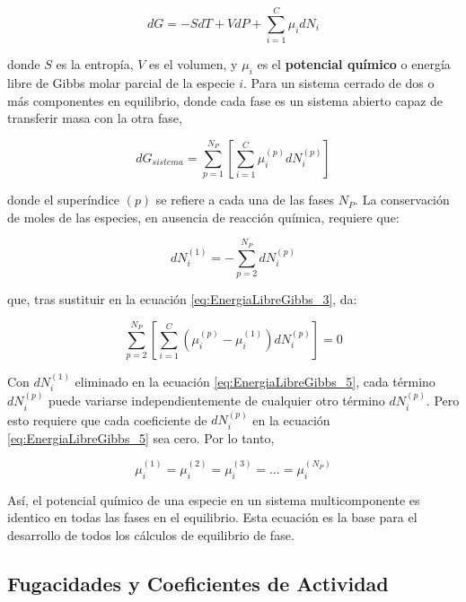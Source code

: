 \documentclass[11pt]{book}
\begin{document}
\begin{equation}
    \label{eq:EnergiaLibreGibbs_2}
    dG = -S dT + V dP + \sum_{i = 1}^{C} \mu_i dN_i
\end{equation}

donde $S$ es la entropía, $V$ es el volumen, y $\mu_i$ es el \textbf{potencial químico} o energía libre de Gibbs molar parcial de la especie $i$. Para un sistema cerrado de dos o más componentes en equilibrio, donde cada fase es un sistema abierto capaz de transferir masa con la otra fase,

\begin{equation}
    \label{eq:EnergiaLibreGibbs_3}
    dG_{sistema} = \sum_{p = 1}^{N_P} \left[ \sum_{i = 1}^{C} \mu_i^{(p)} dN_i^{(p)} \right]
\end{equation}

donde el superíndice $(p)$ se refiere a cada una de las fases $N_P$. La conservación de moles de las especies, en ausencia de reacción química, requiere que:

\begin{equation}
    \label{eq:EnergiaLibreGibbs_4}
    dN_i^{(1)} = - \sum_{p = 2}^{N_P} dN_i^{(p)}
\end{equation}

que, tras sustituir en la ecuación \ref{eq:EnergiaLibreGibbs_3}, da:

\begin{equation}
    \label{eq:EnergiaLibreGibbs_5}
    \sum_{p = 2}^{N_P} \left[ \sum_{i = 1}^{C} \left( \mu_i^{(p)} -\mu_i^{(1)} \right) dN_i^{(p)} \right] = 0
\end{equation}

Con $dN_i^{(1)}$ eliminado en la ecuación \ref{eq:EnergiaLibreGibbs_5}, cada término $dN_i^{(p)}$ puede variarse independientemente de cualquier otro término $dN_i^{(p)}$. Pero esto requiere que cada coeficiente de $dN_i^{(p)}$ en la ecuación \ref{eq:EnergiaLibreGibbs_5} sea cero. Por lo tanto,

\begin{equation}
    \label{eq:EnergiaLibreGibbs_6}
    \mu_i^{(1)} = \mu_i^{(2)} = \mu_i^{(3)} = ... = \mu_i^{(N_P)}
\end{equation}

Así, el potencial químico de una especie en un sistema multicomponente es identico en todas las fases en el equilibrio. Esta ecuación es la base para el desarrollo de todos los cálculos de equilibrio de fase. 


\subsection{Fugacidades y Coeficientes de Actividad}
\end{document}
